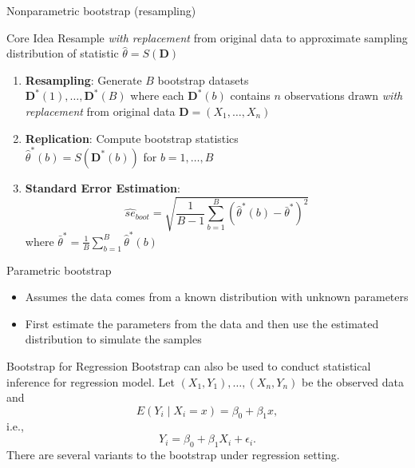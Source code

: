 \documentclass[
  ignorenonframetext,
]{beamer}
\begin{document}
\begin{frame}{Nonparametric bootstrap (resampling)}
\protect{}\label{nonparametric-bootstrap-resampling}
\begin{block}{Core Idea}
Resample \textit{with replacement} from original data to approximate sampling distribution of statistic $\hat{\theta} = S(\mathbf{D})$
\end{block}

\pause
\begin{enumerate}
\item \textbf{Resampling}: Generate $B$ bootstrap datasets \\
$\mathbf{D}^*(1), \ldots, \mathbf{D}^*(B)$ where each $\mathbf{D}^*(b)$ contains $n$ observations drawn \textit{with replacement} from original data $\mathbf{D} = (X_1,\ldots,X_n)$

\pause
\item \textbf{Replication}: Compute bootstrap statistics \\
$\hat{\theta}^*(b) = S(\mathbf{D}^*(b))$ for $b=1,\ldots,B$

\pause
\item \textbf{Standard Error Estimation}:
\[
\widehat{se}_{boot} = \sqrt{\frac{1}{B-1}\sum_{b=1}^B \left(\hat{\theta}^*(b) - \bar{\theta}^*\right)^2}
\]
where $\bar{\theta}^* = \frac{1}{B}\sum_{b=1}^B \hat{\theta}^*(b)$
\end{enumerate}
\end{frame}

\begin{frame}{Parametric bootstrap}
\protect{}\label{parametric-bootstrap}
\begin{itemize}
\item
  Assumes the data comes from a known distribution with unknown
  parameters
\item
  First estimate the parameters from the data and then use the estimated
  distribution to simulate the samples
\end{itemize}
\end{frame}

\begin{frame}{Bootstrap for Regression}
\protect{}\label{bootstrap-for-regression}
Bootstrap can also be used to conduct statistical inference for
regression model. Let
\(\left(X_1, Y_1\right), \ldots,\left(X_n, Y_n\right)\) be the observed
data and \[
E\left(Y_i \mid X_i=x\right)=\beta_0+\beta_1 x,
\] i.e., \[
Y_i=\beta_0+\beta_1 X_i+\epsilon_i .
\] There are several variants to the bootstrap under regression setting.
\end{frame}
\end{document}

